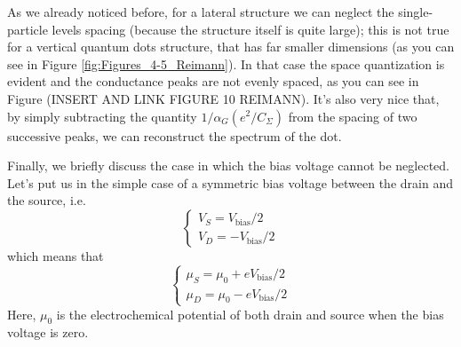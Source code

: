 \documentclass[a4paper,twoside,11pt]{book}
\begin{document}
As we already noticed before, for a lateral structure we can neglect the single-particle levels spacing (because the structure itself is quite large); this is not true for a vertical quantum dots structure, that has far smaller dimensions (as you can see in Figure \ref{fig:Figures_4-5_Reimann}). In that case the space quantization is evident and the conductance peaks are not evenly spaced, as you can see in Figure (INSERT AND LINK FIGURE 10 REIMANN). It's also very nice that, by simply subtracting the quantity $1 / \alpha_G (e^2 / C_{\Sigma})$ from the spacing of two successive peaks, we can reconstruct the spectrum of the dot.

Finally, we briefly discuss the case in which the bias voltage cannot be neglected. Let's put us in the simple case of a symmetric bias voltage between the drain and the source, i.e.
\begin{equation}
	\begin{cases}
		V_S = V_{\text{bias}}/2 \\
		V_D = -V_{\text{bias}}/2
	\end{cases}
\end{equation}
which means that
\begin{equation}
	\begin{cases}
		\mu_S = \mu_0 + eV_{\text{bias}}/2 \\
		\mu_D = \mu_0 - eV_{\text{bias}}/2
	\end{cases}
\end{equation}
Here, $\mu_0$ is the electrochemical potential of both drain and source when the bias voltage is zero.
\end{document}

